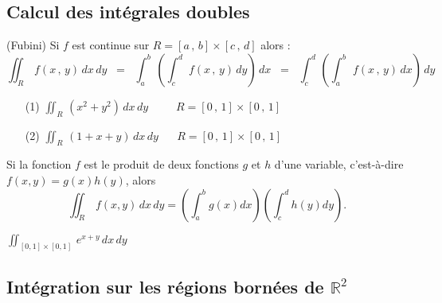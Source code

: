 \documentclass[12pt, class=report,crop=false]{standalone}
\begin{document}
{{{{\subsection{Calcul des intégrales doubles}

\begin{theoreme}(Fubini)
Si $f$ est continue sur $R = [a  \,,\, b ] \times [c  \,,\, d ]$ alors :
$$
 \iint_{R}\, f(x\,,\,y)\, dx\, dy \;\; = \;\; \int_{a}^b\, \left( \int_{c}^d\,\, f(x\,,\,y)\, dy \right)\, dx \;\; = \;\; \int_{c}^d\, \left( \int_{a}^b\,\, f(x\,,\,y)\, dx \right)\, dy
 $$
 \end{theoreme}


\begin{enumerate}
\item[(1)] $\displaystyle  \iint_{R}\, (x^2 + y^2)\, dx\, dy  \;\;\;\;\;\;\;\;\;  R = [0\,,\,1] \times [0\,,\,1]$
\item[(2)] $\displaystyle  \iint_{R}\, (1 + x + y)\, dx\, dy     \;\;\;\;\;\; R = [0\,,\,1] \times [0\,,\,1]$
\end{enumerate}



\begin{corollaire}
Si la fonction $f$ est le produit de deux fonctions $g$ et $h$ d'une variable, c'est-\`a-dire $f(x,y)=g(x)h(y)$, alors
$$ \iint_{R}\, f(x,y)\, dx\, dy =(\int _a^bg(x)dx)(\int_c^dh(y)dy).$$
\end{corollaire}

 $\displaystyle  \iint_{[0,1]\times [0,1]}\, e^{x+y}\, dx\, dy $



\subsection{Intégration sur les régions bornées de $\mathbb{R}^2$}


}}}}
\end{document}
